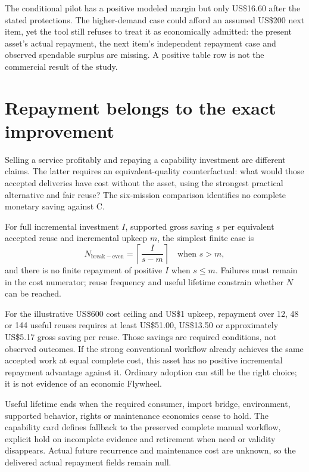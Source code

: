 \documentclass[11pt,letterpaper]{article}
\newcommand{\usd}[1]{US\$#1}
\begin{document}
The conditional pilot has a positive modeled margin but only \usd{16.60} after the stated protections. The higher-demand case could afford an assumed \usd{200} next item, yet the tool still refuses to treat it as economically admitted: the present asset's actual repayment, the next item's independent repayment case and observed spendable surplus are missing. A positive table row is not the commercial result of the study.

\section{Repayment belongs to the exact improvement}
Selling a service profitably and repaying a capability investment are different claims. The latter requires an equivalent-quality counterfactual: what would those accepted deliveries have cost without the asset, using the strongest practical alternative and fair reuse? The six-mission comparison identifies no complete monetary saving against C.

For full incremental investment $I$, supported gross saving $s$ per equivalent accepted reuse and incremental upkeep $m$, the simplest finite case is
\begin{equation}
N_{\mathrm{break-even}}=\left\lceil\frac{I}{s-m}\right\rceil\quad\text{when }s>m,
\end{equation}
and there is no finite repayment of positive $I$ when $s\leq m$. Failures must remain in the cost numerator; reuse frequency and useful lifetime constrain whether $N$ can be reached.

For the illustrative \usd{600} cost ceiling and \usd{1} upkeep, repayment over 12, 48 or 144 useful reuses requires at least \usd{51.00}, \usd{13.50} or approximately \usd{5.17} gross saving per reuse. Those savings are required conditions, not observed outcomes. If the strong conventional workflow already achieves the same accepted work at equal complete cost, this asset has no positive incremental repayment advantage against it. Ordinary adoption can still be the right choice; it is not evidence of an economic Flywheel.

Useful lifetime ends when the required consumer, import bridge, environment, supported behavior, rights or maintenance economics cease to hold. The capability card defines fallback to the preserved complete manual workflow, explicit hold on incomplete evidence and retirement when need or validity disappears. Actual future recurrence and maintenance cost are unknown, so the delivered actual repayment fields remain null.
\end{document}
